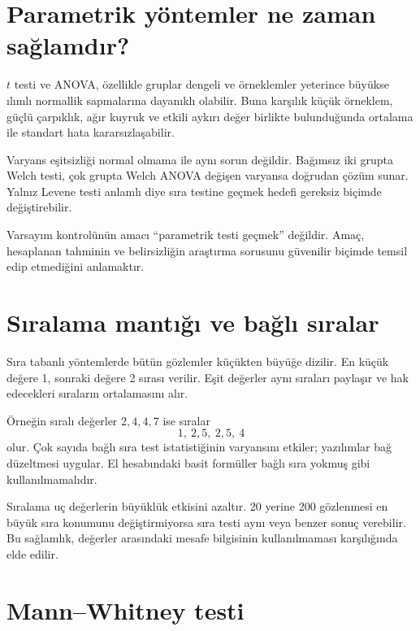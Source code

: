 \section{Parametrik yöntemler ne zaman sağlamdır?}

$t$ testi ve ANOVA, özellikle gruplar dengeli ve örneklemler yeterince büyükse
ılımlı normallik sapmalarına dayanıklı olabilir. Buna karşılık küçük örneklem,
güçlü çarpıklık, ağır kuyruk ve etkili aykırı değer birlikte bulunduğunda
ortalama ile standart hata kararsızlaşabilir.

Varyans eşitsizliği normal olmama ile aynı sorun değildir. Bağımsız iki grupta
Welch testi, çok grupta Welch ANOVA değişen varyansa doğrudan çözüm sunar.
Yalnız Levene testi anlamlı diye sıra testine geçmek hedefi gereksiz biçimde
değiştirebilir.

\begin{sezgibox}
Varsayım kontrolünün amacı ``parametrik testi geçmek'' değildir. Amaç,
hesaplanan tahminin ve belirsizliğin araştırma sorusunu güvenilir biçimde
temsil edip etmediğini anlamaktır.
\end{sezgibox}

\section{Sıralama mantığı ve bağlı sıralar}

Sıra tabanlı yöntemlerde bütün gözlemler küçükten büyüğe dizilir. En küçük
değere 1, sonraki değere 2 sırası verilir. Eşit değerler aynı sıraları
paylaşır ve hak edecekleri sıraların ortalamasını alır.

Örneğin sıralı değerler $2,4,4,7$ ise sıralar
\[
1,\ 2{,}5,\ 2{,}5,\ 4
\]
olur. Çok sayıda bağlı sıra test istatistiğinin varyansını etkiler; yazılımlar
bağ düzeltmesi uygular. El hesabındaki basit formüller bağlı sıra yokmuş gibi
kullanılmamalıdır.

Sıralama uç değerlerin büyüklük etkisini azaltır. 20 yerine 200 gözlenmesi en
büyük sıra konumunu değiştirmiyorsa sıra testi aynı veya benzer sonuç verebilir.
Bu sağlamlık, değerler arasındaki mesafe bilgisinin kullanılmaması karşılığında
elde edilir.

\section{Mann--Whitney testi}

